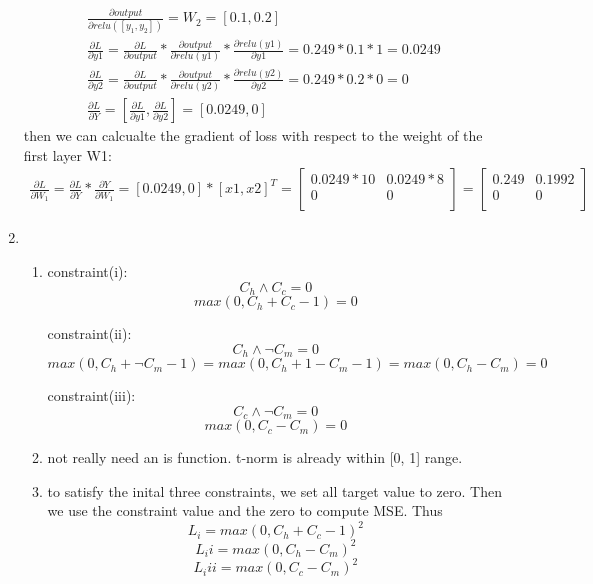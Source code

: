 \documentclass[12pt]{article}
\begin{document}
\begin{enumerate}
    \begin{align}
    \frac{\partial output}{\partial relu([y_1, y_2])} = W_2 = [0.1, 0.2] \\
    \frac{\partial L}{\partial y1} = \frac{\partial L}{\partial output} * \frac{\partial output}{\partial relu(y1)} * \frac{\partial relu(y1)}{\partial y1} = 0.249 * 0.1 * 1 = 0.0249 \\
    \frac{\partial L}{\partial y2} = \frac{\partial L}{\partial output} * \frac{\partial output}{\partial relu(y2)} * \frac{\partial relu(y2)}{\partial y2} = 0.249 * 0.2 * 0 = 0 \\
    \frac{\partial L}{\partial Y} = [\frac{\partial L}{\partial y1}, \frac{\partial L}{\partial y2}] = [0.0249, 0]
    \end{align}
    then we can calcualte the gradient of loss with respect to the weight of the first layer W1:
    \begin{align}
      \frac{\partial L}{\partial W_1} = \frac{\partial L}{\partial Y} * \frac{\partial Y}{\partial W_1} = [0.0249, 0] * [x1, x2]^T = \begin{bmatrix}
        0.0249 * 10 & 0.0249 * 8\\
        0 & 0\\
      \end{bmatrix} = \begin{bmatrix}
        0.249 & 0.1992\\
        0 & 0\\
      \end{bmatrix}
    \end{align}
\item
  \begin{enumerate}
  \item 
    constraint(i):  $$C_h \land C_c = 0 $$  $$max(0, C_h + C_ c - 1) = 0$$
    
    constraint(ii):  $$C_h \land \neg C_m = 0 $$ $$max(0, C_h + \neg C_m - 1) = max(0, C_h + 1 - C_m - 1) = max(0, C_h - C_m) = 0$$

    constraint(iii):  $$C_c \land \neg C_m = 0$$ $$ max(0, C_c - C_m) = 0  $$

  \item not really need an is function. t-norm is already within [0, 1] range. 
  \item to satisfy the inital three constraints, we set all target value to zero. Then we use the constraint value and the zero to compute MSE.
  Thus $$L_i = max(0, C_h + C_c - 1) ^ 2$$
  $$L_ii = max(0, C_h - C_m) ^ 2$$
  $$L_iii = max(0, C_c - C_m) ^ 2$$
  \end{enumerate}
\end{enumerate}
\end{document}
